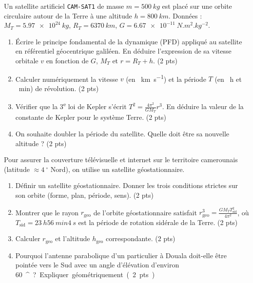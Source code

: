 \documentclass[11pt]{article}
\providecommand{\degree}{^{\circ}}
\begin{document}
\begin{exercice}
Un satellite artificiel \texttt{CAM-SAT1} de masse $m = \SI{500}{kg}$ est placé sur une orbite circulaire autour de la Terre à une altitude $h = \SI{800}{km}$.
Données : $M_T = \SI{5,97e24}{kg}$, $R_T = \SI{6370}{km}$, $G = \SI{6,67e-11}{N.m^2.kg^{-2}}$.
\begin{enumerate}
    \item Écrire le principe fondamental de la dynamique (PFD) appliqué au satellite en référentiel géocentrique galiléen. En déduire l'expression de sa vitesse orbitale $v$ en fonction de $G$, $M_T$ et $r = R_T + h$. (2 pts)
    \item Calculer numériquement la vitesse $v$ (en \SI{}{km.s^{-1}}) et la période $T$ (en \SI{}{h} et \SI{}{min}) de révolution. (2 pts)
    \item Vérifier que la 3\textsuperscript{e} loi de Kepler s'écrit $T^2 = \frac{4\pi^2}{GM_T}r^3$. En déduire la valeur de la constante de Kepler pour le système Terre. (2 pts)
    \item On souhaite doubler la période du satellite. Quelle doit être sa nouvelle altitude ? (2 pts)
\end{enumerate}
\end{exercice}

\begin{exercice}
Pour assurer la couverture télévisuelle et internet sur le territoire camerounais (latitude $\approx \SI{4}{\degree}$ Nord), on utilise un satellite géostationnaire.
\begin{enumerate}
    \item Définir un satellite géostationnaire. Donner les trois conditions strictes sur son orbite (forme, plan, période, sens). (2 pts)
    \item Montrer que le rayon $r_{\text{geo}}$ de l'orbite géostationnaire satisfait $r_{\text{geo}}^3 = \frac{GM_T T_{\text{sid}}^2}{4\pi^2}$, où $T_{\text{sid}} = \SI{23}{h}\SI{56}{min}\SI{4}{s}$ est la période de rotation sidérale de la Terre. (2 pts)
    \item Calculer $r_{\text{geo}}$ et l'altitude $h_{\text{geo}}$ correspondante. (2 pts)
    \item Pourquoi l'antenne parabolique d'un particulier à Douala doit-elle être pointée vers le Sud avec un angle d'élévation d'environ \SI{60}{\degree} ? Expliquer géométriquement. (2 pts)
\end{enumerate}
\end{exercice}
\end{document}
